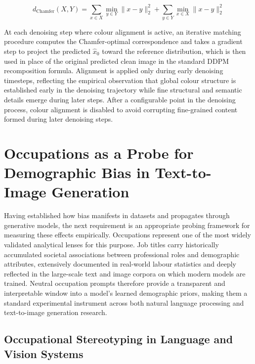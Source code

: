 \begin{equation}
	d_\text{Chamfer}(X, Y) = \sum_{x \in X} \min_{y \in Y}
	\|x - y\|_2^2 + \sum_{y \in Y} \min_{x \in X} \|x - y\|_2^2
\end{equation}

At each denoising step where colour alignment is active, an iterative matching procedure computes the Chamfer-optimal correspondence and takes a gradient step to project the predicted $\hat{x}_0$ toward the reference distribution, which is then used in place of the original predicted clean image in the standard DDPM recomposition formula. Alignment is applied only during early denoising timesteps, reflecting the empirical observation that global colour structure is established early in the denoising trajectory while fine structural and semantic details emerge during later steps. After a configurable point in the denoising process, colour alignment is disabled to avoid corrupting fine-grained content formed during later denoising steps.

\section{Occupations as a Probe for Demographic Bias in Text-to-Image Generation}
\label{sec:occupations}

Having established how bias manifests in datasets and propagates through generative models, the next requirement is an appropriate probing framework for measuring these effects empirically. Occupations represent one of the most widely validated analytical lenses for this purpose. Job titles carry historically accumulated societal associations between professional roles and demographic attributes, extensively documented in real-world labour statistics and deeply reflected in the large-scale text and image corpora on which modern models are trained. Neutral occupation prompts therefore provide a transparent and interpretable window into a model's learned demographic priors, making them a standard experimental instrument across both natural language processing and text-to-image generation research.

\subsection{Occupational Stereotyping in Language and Vision Systems}
\label{subsubsec:occupational_stereo}

